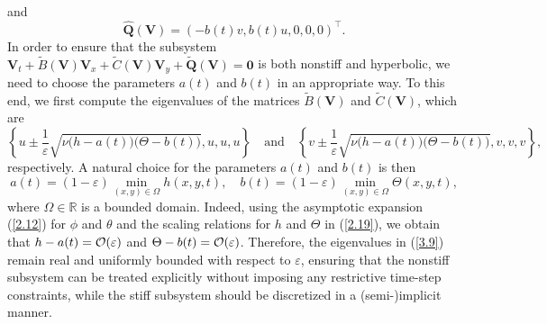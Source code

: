\documentclass[a4paper,11pt,twoside]{article}
\numberwithin{equation}{section}
\numberwithin{figure}{section}
\numberwithin{table}{section}
\newcommand{\eps}{\varepsilon}
\newcommand{\bV}{\bm{V}}
\newcommand{\bQ}{\bm{Q}}
\newcommand\eref[1]{(\ref{#1})}
\begin{document}
and
\begin{equation}
\widehat{\bQ}(\bV)=\left(-b(t)v,b(t)u,0,0,0\right)^\top.
\label{3.8}
\end{equation}
In order to ensure that the subsystem $\bV_t+\widetilde B(\bV)\bV_x+\widetilde C(\bV)\bV_y+\widetilde{\bQ}(\bV)=\bm0$ is both nonstiff and
hyperbolic, we need to choose the parameters $a(t)$ and $b(t)$ in an appropriate way. To this end, we first compute the eigenvalues of the
matrices $\widetilde B(\bV)$ and $\widetilde C(\bV)$, which are
\begin{equation}
\left\{u\pm\frac{1}{\eps}\sqrt{\nu\big(h-a(t)\big)\big(\Theta-b(t)\big)},u,u,u\right\}\quad\mbox{and}\quad
\left\{v\pm\frac{1}{\eps}\sqrt{\nu\big(h-a(t)\big)\big(\Theta-b(t)\big)},v,v,v\right\},
\label{3.9}
\end{equation}
respectively. A natural choice for the parameters $a(t)$ and $b(t)$ is then
\begin{equation}
a(t)=(1-\eps)\!\min_{(x,y)\in\Omega}\!h(x,y,t),\quad b(t)=(1-\eps)\!\min_{(x,y)\in\Omega}\!\Theta(x,y,t),
\label{3.10f}
\end{equation}
where $\Omega\in\mathbb R$ is a bounded domain. Indeed, using the asymptotic expansion \eref{2.12} for $\phi$ and $\theta$ and the scaling
relations for $h$ and $\Theta$ in \eref{2.19}, we obtain that $h-a(t)={\cal O}(\eps)$ and $\Theta-b(t)={\cal O}(\eps)$. Therefore, the
eigenvalues in \eref{3.9} remain real and uniformly bounded with respect to $\eps$, ensuring that the nonstiff subsystem can be treated 
explicitly without imposing any restrictive time-step constraints, while the stiff subsystem should be discretized in a (semi-)implicit
manner.  

\end{document}
